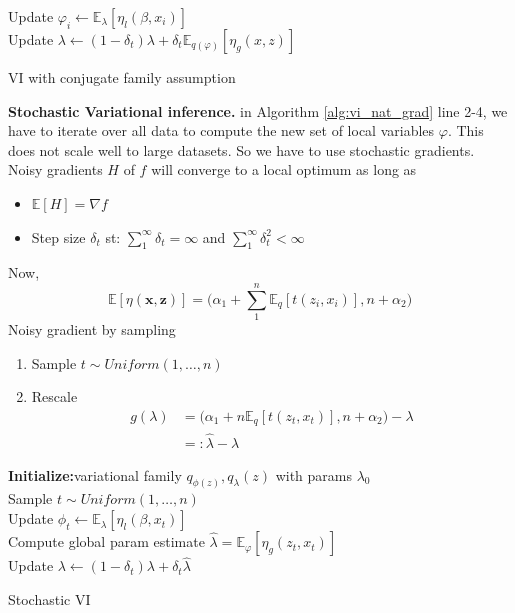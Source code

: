 \documentclass[letterpaper]{article}
\newcommand{\red}[1]{\textcolor{BrickRed}{#1}}
\newcommand{\bx}{\mathbf{x}}
\newcommand{\bz}{\mathbf{z}}
\newcommand{\EE}[1]{\mathbb{E}\left[#1\right]}
\newcommand{\EEE}[2]{\mathbb{E}_{#1}\left[#2\right]}
\newcommand{\mypar}[1]{{\bf #1.}}
\begin{document}
  \begin{algorithm}[h]
   {
     {
      Update $\varphi_i \gets \EEE{\lambda}{\eta_l(\beta, x_i)}$\\
    }
    \red{Update $\lambda \gets (1 - \delta_t)\lambda +
                                  \delta_t \EEE{q(\varphi)}{\eta_g(x, z)}$}\\
  }
  \caption{VI with conjugate family assumption}
  \label{alg:vi_nat_grad}
  \end{algorithm}
  
  \mypar{Stochastic Variational inference}
  in Algorithm \ref{alg:vi_nat_grad} line 2-4, we have to iterate over all data 
  to compute the new set of local variables $\varphi$. This does not scale well
  to large datasets. \cite{hoffman2013stochastic}
  So we have to use stochastic gradients. Noisy gradients $H$ of $f$ will converge
  to a local optimum as long as
  \begin{itemize}
    \item $\EE{H} = \nabla f$
    \item Step size $\delta_t$ st: $\sum_{1}^{\infty}\delta_t = \infty$ and
    $\sum_{1}^{\infty}\delta_t^{2} < \infty$
  \end{itemize}
  Now,
  $$
    \EE{\eta(\bx, \bz)} = \Big(\alpha_1 + \sum_{1}^{n}\EEE{q}{t(z_i, x_i)},
                               n + \alpha_2 \Big)
  $$
  Noisy gradient by sampling
  \begin{enumerate}
    \item Sample $t \sim Uniform(1, \ldots, n)$
    \item Rescale 
      \begin{align*}
        g(\lambda) &= \Big(\alpha_1 + n\EEE{q}{t(z_t, x_t)},
                      n + \alpha_2 \Big) - \lambda \\
                   &=: \hat{\lambda} - \lambda
      \end{align*}
  \end{enumerate}
  \begin{algorithm}[h]
  \KwIn{A model $p(\bx, \bz)$, data $\bx$}
  {\bf Initialize:}{variational family $q_{\phi(z)}, q_{\lambda}(z)$ with params $\lambda_{0}$}\\
   {
    \red{Sample $t \sim Uniform(1, \ldots, n)$} \\
    \red{Update $\phi_t \gets \EEE{\lambda}{\eta_l(\beta, x_t)}$} \\
    \red{Compute global param estimate $\hat{\lambda} = \EEE{\varphi}{\eta_g(z_t, x_t)}$} \\
    \red{Update $\lambda \gets (1 - \delta_t)\lambda +
            \delta_t \hat{\lambda}$} \\
  }
  \Return{$\lambda$}
  \caption{Stochastic VI}
  \label{alg:vi_stoc_grad}
  \end{algorithm}
\end{document}
